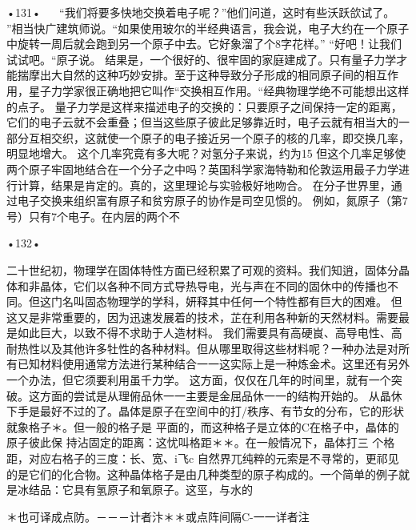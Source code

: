 •131•
  
“我们将要多快地交换着电子呢？”他们问道，这时有些沃跃欱试了。
”相当快广建筑师说。“如果使用玻尔的半经典语言，我会说，电子大约在一个原子中旋转一周后就会跑到另一个原子中去。它好象溜了个8字花样。”
“好吧！让我们试试吧。“原子说。
结果是，一个很好的、很牢固的家庭建成了。只有量子力学才能揣摩出大自然的这种巧妙安排。至于这种导致分子形成的相同原子间的相互作用，星子力学家很正确地把它叫作“交换相互作用。“经典物理学绝不可能想出这样的点子。
量子力学是这样来描述电子的交换的：只要原子之间保持一定的距离，它们的电子云就不会重叠；但当这些原子彼此足够靠近时，电子云就有相当大的一部分互相交织，这就使一个原子的电子接近另一个原子的核的几率，即交换几率，明显地增大。
这个几率究竟有多大呢？对氢分子来说，约为15%
但这个几率足够使两个原子牢固地结合在一个分子之中吗？英国科学家海特勒和伦敦运用最子力学进行计算，结果是肯定的。真的，这里理论与实验极好地吻合。
在分子世界里，通过电子交换来组织富有原子和贫穷原子的协作是司空见惯的。
例如，氮原子（第7号）只有7个电子。在内层的两个不

•132•
  

二十世纪初，物理学在固体特性方面已经积累了可观的资料。我们知逍，固体分晶体和非晶体，它们以各种不同方式导热导电，光与声在不同的固休中的传播也不同。但这门名叫固态物理学的学科，妍释其中任何一个特性都有巨大的困难。
但这又是非常重要的，因为迅速发展着的技术，芷在利用各种新的天然材料。需要最是如此巨大，以致不得不求助于人造材料。
我们需要具有高硬峎、高导电性、高耐热性以及其他许多牡性的各种材料。但从哪里取得这些材料呢？一种办法是对所有已知材料使用通常方法进行某种结合一一这实际上是一种炼金术。这里还有另外一个办法，但它须要利用虽千力学。
这方面，仅仅在几年的时间里，就有一个突破。这方面的尝试是从理俯品休一一主要是金屈品休一一的结构开始的。
从晶休下手是最好不过的了。晶体是原子在空间中的打/秩序、有节女的分布，它的形状就象格子＊。但一般的格子是
平面的，而这种格子是立体的C在格子中，晶体的原子彼此保
持沾固定的距离：这忧叫格距＊＊。在一般情况下，晶体打三
个格距，对应右格子的三度：长、宽、i飞c
自然界兀纯粹的元索是不寻常的，更祁见的是它们的化合物。这种晶体格子是由几种类型的原子构成的。一个简单的例子就是冰结品：它具有氢原子和氧原子。这巠，与水的

＊也可译成点防。－－－计者汴＊＊或点阵间隔C-一一详者注

